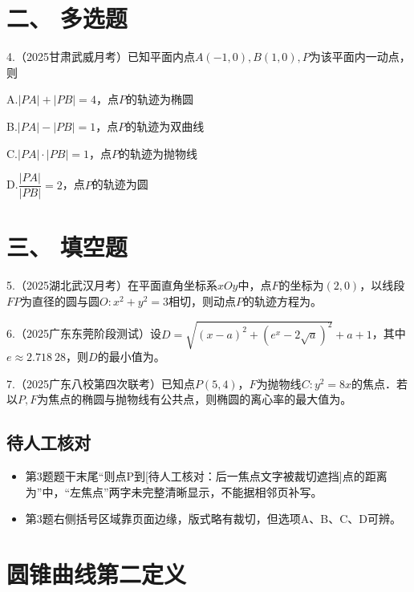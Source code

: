 \documentclass[UTF8,a4paper,11pt]{ctexart}
\begin{document}
\section*{二、 多选题}

4.（2025甘肃武威月考）已知平面内点$A(-1,0),B(1,0),P$为该平面内一动点，则

A.$|PA|+|PB|=4$，点$P$的轨迹为椭圆

B.$|PA|-|PB|=1$，点$P$的轨迹为双曲线

C.$|PA|\cdot|PB|=1$，点$P$的轨迹为抛物线

D.$\dfrac{|PA|}{|PB|}=2$，点$P$的轨迹为圆

\section*{三、 填空题}

5.（2025湖北武汉月考）在平面直角坐标系$xOy$中，点$F$的坐标为$(2,0)$，以线段$FP$为直径的圆与圆$O:x^2+y^2=3$相切，则动点$P$的轨迹方程为\underline{\hspace{8em}}。

6.（2025广东东莞阶段测试）设$D=\sqrt{(x-a)^2+(e^x-2\sqrt{a})^2}+a+1$，其中$e\approx 2.718\ 28$，则$D$的最小值为\underline{\hspace{6em}}。

7.（2025广东八校第四次联考）已知点$P(5,4)$，$F$为抛物线$C:y^2=8x$的焦点．若以$P,F$为焦点的椭圆与抛物线有公共点，则椭圆的离心率的最大值为\underline{\hspace{6em}}。

\subsection*{待人工核对}

\begin{itemize}

\item 第3题题干末尾“则点P到[待人工核对：后一焦点文字被裁切遮挡]点的距离为”中，“左焦点”两字未完整清晰显示，不能据相邻页补写。

\item 第3题右侧括号区域靠页面边缘，版式略有裁切，但选项A、B、C、D可辨。

\end{itemize}

\clearpage

\section{圆锥曲线第二定义}
\end{document}
